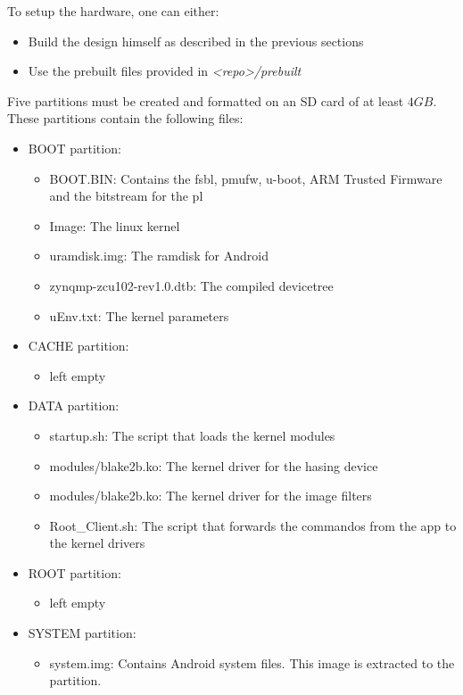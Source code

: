 To setup the hardware, one can either:
\begin{itemize}
	\item Build the design himself as described in the previous sections
	\item Use the prebuilt files provided in \emph{<repo>/prebuilt}
\end{itemize}

Five partitions must be created and formatted on an SD card of at least $4GB$. These partitions contain the following files:
\begin{itemize}
    \item BOOT partition:
    \begin{itemize}
        \item BOOT.BIN: Contains the \gls{fsbl}, \gls{pmufw}, u-boot, ARM Trusted Firmware and the bitstream for the \gls{pl}
        \item Image: The linux kernel
        \item uramdisk.img: The ramdisk for Android
        \item zynqmp-zcu102-rev1.0.dtb: The compiled devicetree
        \item uEnv.txt: The kernel parameters 
    \end{itemize}
    
    \item CACHE partition:
    \begin{itemize}
        \item left empty
    \end{itemize}
    
    \item DATA partition:
    \begin{itemize}
        \item startup.sh: The script that loads the kernel modules
        \item modules/blake2b.ko: The kernel driver for the hasing device
        \item modules/blake2b.ko: The kernel driver for the image filters
        \item Root\_Client.sh: The script that forwards the commandos from the app to the kernel drivers
    \end{itemize}
    
    \item ROOT partition:
    \begin{itemize}
        \item left empty
    \end{itemize}
    
    \item SYSTEM partition:
    \begin{itemize}
        \item system.img: Contains Android system files. This image is extracted to the partition. 
    \end{itemize}
\end{itemize}

